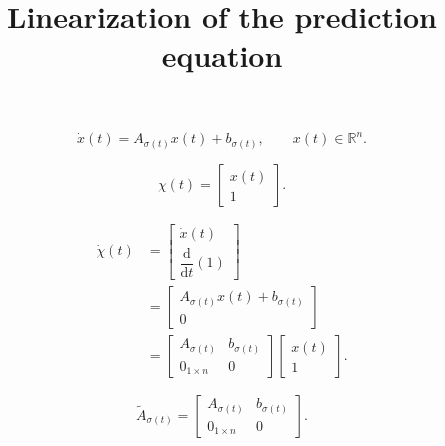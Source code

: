 \documentclass[12pt]{article}
\title{Linearization of the prediction equation}
\author{}
\date{}
\newcommand{\R}{\mathbb{R}}
\begin{document}
\maketitle

\begin{equation}
    \dot{x}(t)=A_{\sigma(t)}x(t)+b_{\sigma(t)},
    \qquad x(t)\in\R^n.
    \label{eq:affine-system}
\end{equation}

\begin{equation}
    \chi(t)=
    \begin{bmatrix}
        x(t)\\
        1
    \end{bmatrix}.
    \label{eq:augmented-state}
\end{equation}

\begin{equation}
\begin{aligned}
    \dot{\chi}(t)
    &=
    \begin{bmatrix}
        \dot{x}(t)\\[2pt]
        \dfrac{\mathrm d}{\mathrm dt}(1)
    \end{bmatrix}                                                    \\[4pt]
    &=
    \begin{bmatrix}
        A_{\sigma(t)}x(t)+b_{\sigma(t)}\\
        0
    \end{bmatrix}                                                    \\[4pt]
    &=
    \begin{bmatrix}
        A_{\sigma(t)} & b_{\sigma(t)}\\
        0_{1\times n} & 0
    \end{bmatrix}
    \begin{bmatrix}
        x(t)\\
        1
    \end{bmatrix}.
\end{aligned}
\label{eq:augmented-construction}
\end{equation}

\begin{equation}
    \widetilde A_{\sigma(t)}=
    \begin{bmatrix}
        A_{\sigma(t)} & b_{\sigma(t)}\\
        0_{1\times n} & 0
    \end{bmatrix}.
    \label{eq:augmented-matrix}
\end{equation}
\end{document}
